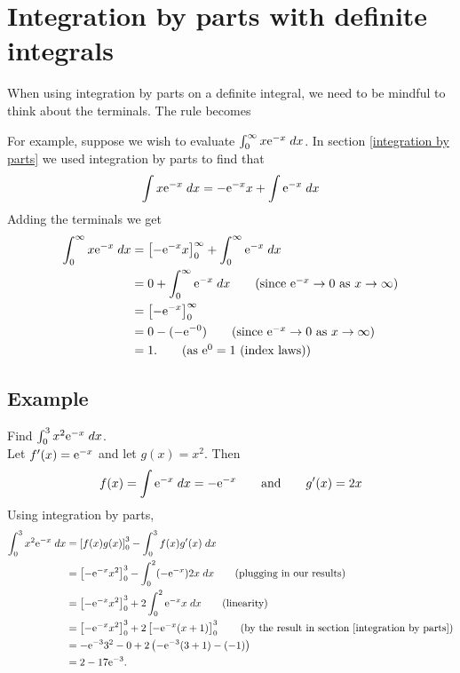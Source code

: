 \section{Integration by parts with definite integrals} \label{sec18.2}
When using integration by parts on a definite integral, we need to be mindful to think about the terminals. The rule becomes

  	\bigskip
	
	\hfil{}
	\bigskip

\noindent For example, suppose we wish to evaluate $\int_0^\infty x\mathrm{e}^{-x} \; dx$. In section \ref{integration by parts} we used integration by parts to find that
\[
\int x\mathrm{e}^{-x} \; dx =  -\mathrm{e}^{-x}x + \int \mathrm{e}^{-x} \; dx 
\]
Adding the terminals we get
\begin{align*}
\int_0^\infty x\e^{-x} \; dx & =  \squac{-\e^{-x}x}_0^\infty + \int_0^\infty \e^{-x} \; dx  \\
		& = 0 + \int_0^\infty \e^{-x} \; dx \tag{since $\e^{-x} \rightarrow 0$ as $x \rightarrow \infty$} \\
		& = \squac{-\e^{-x}}_0^\infty \\
		& = 0 - (-\e^{-0}) \tag{since $\e^{-x} \rightarrow 0$ as $x \rightarrow \infty$} \\
		& = 1. \tag{as $\e^0 = 1$ (index laws)}
\end{align*}

\subsection{Example}
Find $\int_0^3 x^2\mathrm{e}^{-x} \; dx$. \\

\solution
Let $f'(x) = \mathrm{e}^{-x}$ and let $g(x) = x^2$. Then
\[
f(x) = \int \mathrm{e}^{-x} \; dx = -\mathrm{e}^{-x} \qquad \text{and} \qquad g'(x) = 2x
\]
\noindent Using integration by parts,
\begin{align*}
\int_0^3 x^2\e^{-x} \; dx & = \squac{f(x)g(x)}_0^3 - \int_0^3 f(x)g'(x) \; dx \\
	& = \squac{-\e^{-x}x^2}_0^3 - \int_0^2 (-\e^{-x})2x \; dx \tag{plugging in our results} \\
	& = \squac{-\e^{-x}x^2}_0^3 + 2\int_0^2 \e^{-x}x \; dx \tag{linearity} \\
	& = \squac{-\e^{-x}x^2}_0^3 + 2\squac{-\e^{-x}(x+1)}_0^3 \tag{by the result in section \ref{integration by parts}} \\
	& = -\e^{-3}3^2 - 0 + 2\brac{-\e^{-3}(3+1) - (-1)} \\
	& = 2 - 17\e^{-3}.
\end{align*}

